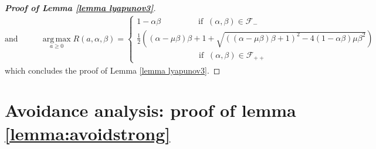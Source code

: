 \documentclass[reqno]{amsart}
\theoremstyle{plain}
\theoremstyle{definition}
\theoremstyle{remark}
\DeclareMathOperator*{\argmax}{arg\,max}	%
\newcommand{\Fb}{\mathcal{F}}
\begin{document}
\begin{proof}[\textbf{Proof of Lemma \ref{lemma lyapunov3}}]
\begin{equation}
\text{and } \qquad	\begin{aligned}
		\underset{a\geq 0}{\argmax} R(a,\alpha,\beta)= \begin{cases}
			1-\alpha\beta \qquad \qquad  ~ \text{ if } ~   (\alpha,\beta) \in \Fb_{-} \\
			\frac{1}{2}\left((\alpha-\mu\beta)\beta+1 + \sqrt{\left((\alpha-\mu\beta)\beta+1\right)^{2}-4(1-\alpha\beta)\mu\beta^{2}}\right)  & \\ 
			\qquad \qquad \qquad \quad   ~ \text{ if } ~  (\alpha,\beta) \in \Fb_{++} &
		\end{cases}
	\end{aligned}
\end{equation}
which concludes the proof of Lemma \ref{lemma lyapunov3}.
\end{proof}



\section{Avoidance analysis: proof of lemma \ref{lemma:avoidstrong}}
\label{app:avoidance}

\end{document}
